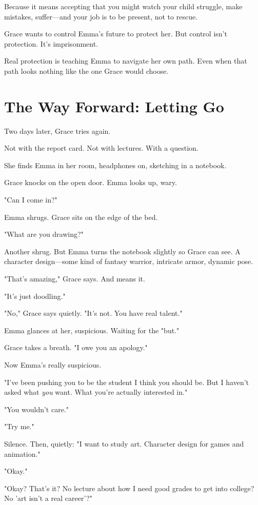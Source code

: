 \documentclass[11pt,twoside]{book}
\begin{document}
Because it means accepting that you might watch your child struggle, make mistakes, suffer—and your job is to be present, not to rescue.

Grace wants to control Emma's future to protect her. But control isn't protection. It's imprisonment.

Real protection is teaching Emma to navigate her own path. Even when that path looks nothing like the one Grace would choose.

\section*{The Way Forward: Letting Go}

Two days later, Grace tries again.

Not with the report card. Not with lectures. With a question.

She finds Emma in her room, headphones on, sketching in a notebook.

Grace knocks on the open door. Emma looks up, wary.

"Can I come in?"

Emma shrugs. Grace sits on the edge of the bed.

"What are you drawing?"

Another shrug. But Emma turns the notebook slightly so Grace can see. A character design—some kind of fantasy warrior, intricate armor, dynamic pose.

"That's amazing," Grace says. And means it.

"It's just doodling."

"No," Grace says quietly. "It's not. You have real talent."

Emma glances at her, suspicious. Waiting for the "but."

Grace takes a breath. "I owe you an apology."

Now Emma's really suspicious.

"I've been pushing you to be the student I think you should be. But I haven't asked what \emph{you} want. What you're actually interested in."

"You wouldn't care."

"Try me."

Silence. Then, quietly: "I want to study art. Character design for games and animation."

"Okay."

"Okay? That's it? No lecture about how I need good grades to get into college? No 'art isn't a real career'?"
\end{document}
